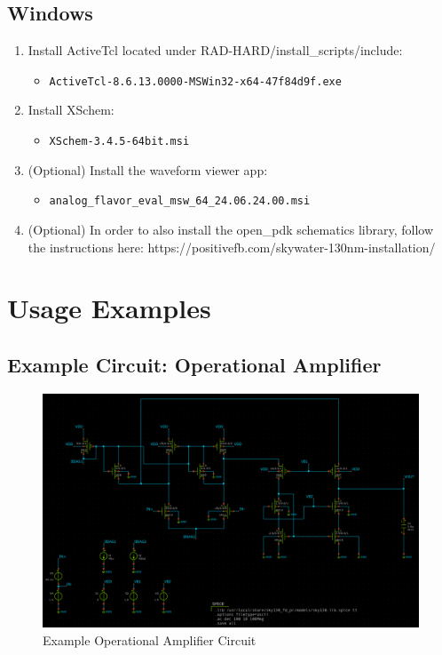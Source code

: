\documentclass[12pt]{article}
\begin{document}
    \subsection{Windows}\label{subsec:installation-windows}
    \begin{enumerate}
        \item Install ActiveTcl located under RAD-HARD/install_scripts/include:
        \begin{itemize}
            \item \texttt{ActiveTcl-8.6.13.0000-MSWin32-x64-47f84d9f.exe}
        \end{itemize}

        \item Install XSchem:
        \begin{itemize}
            \item \texttt{XSchem-3.4.5-64bit.msi}
        \end{itemize}

        \item (Optional) Install the waveform viewer app:
        \begin{itemize}
            \item \texttt{analog\_flavor\_eval\_msw\_64\_24.06.24.00.msi}
        \end{itemize}

        \item (Optional) In order to also install the open_pdk schematics library, follow the instructions here: https://positivefb.com/skywater-130nm-installation/
    \end{enumerate}


    \section{Usage Examples}\label{sec:usage-examples}

    \subsection{Example Circuit: Operational Amplifier}\label{subsec:example-circuit-operational-amplifier}
    \begin{figure}[htbp]
        \centering
        \includegraphics[width=0.8\linewidth]{example_circuit_opamp}
        \caption{Example Operational Amplifier Circuit}
        \label{fig:opamp}
    \end{figure}
\end{document}
